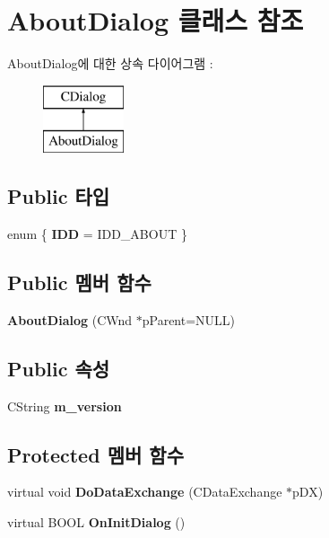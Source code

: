 \hypertarget{class_about_dialog}{}\section{About\+Dialog 클래스 참조}
\label{class_about_dialog}
About\+Dialog에 대한 상속 다이어그램 \+: \begin{figure}[H]
\begin{center}
\leavevmode
\includegraphics[height=2.000000cm]{class_about_dialog}
\end{center}
\end{figure}
\subsection*{Public 타입}
\begin{DoxyCompactItemize}
\item 
\mbox{\label{class_about_dialog_ad39ef53347d21ec0cb70ff40df557e61}} 
enum \{ {\bfseries I\+DD} = I\+D\+D\+\_\+\+A\+B\+O\+UT
 \}
\end{DoxyCompactItemize}
\subsection*{Public 멤버 함수}
\begin{DoxyCompactItemize}
\item 
\mbox{\label{class_about_dialog_a4a8056094af91d12bca94d4fcba1aeae}} 
{\bfseries About\+Dialog} (C\+Wnd $\ast$p\+Parent=N\+U\+LL)
\end{DoxyCompactItemize}
\subsection*{Public 속성}
\begin{DoxyCompactItemize}
\item 
\mbox{\label{class_about_dialog_a78e658a0c2d03632ce86a675b89d8492}} 
C\+String {\bfseries m\+\_\+version}
\end{DoxyCompactItemize}
\subsection*{Protected 멤버 함수}
\begin{DoxyCompactItemize}
\item 
\mbox{\label{class_about_dialog_a098f0327b766a8c3fff0fef3076dc9eb}} 
virtual void {\bfseries Do\+Data\+Exchange} (C\+Data\+Exchange $\ast$p\+DX)
\item 
\mbox{\label{class_about_dialog_ab42eeca93160e48d480b004aaf33c353}} 
virtual B\+O\+OL {\bfseries On\+Init\+Dialog} ()
\end{DoxyCompactItemize}


